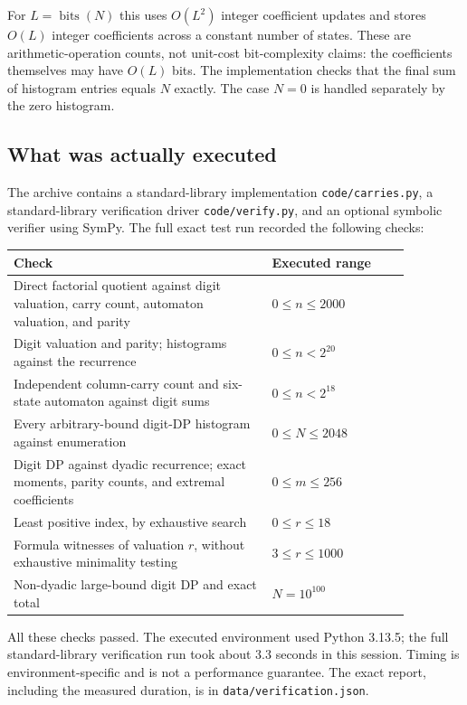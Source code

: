 \documentclass[11pt]{article}
\theoremstyle{definition}\newtheorem{definition}[theorem]{Definition}
\theoremstyle{remark}\newtheorem{remark}[theorem]{Remark}
\newcommand{\bits}{\operatorname{bits}}
\begin{document}
For $L=\bits(N)$ this uses $O(L^2)$ integer coefficient updates and stores
$O(L)$ integer coefficients across a constant number of states. These
are arithmetic-operation counts, not unit-cost bit-complexity claims:
the coefficients themselves may have $O(L)$ bits. The implementation
checks that the final sum of histogram entries equals $N$ exactly.
The case $N=0$ is handled separately by the zero histogram.

\subsection{What was actually executed}
The archive contains a standard-library implementation
\texttt{code/carries.py}, a standard-library verification driver
\texttt{code/verify.py}, and an optional symbolic verifier using SymPy.
The full exact test run recorded the following checks:
\begin{center}
\begin{tabular}{p{0.57\linewidth}p{0.30\linewidth}}
\toprule
Check & Executed range\\
\midrule
Direct factorial quotient against digit valuation, carry count,
automaton valuation, and parity & $0\leq n\leq2000$\\
Digit valuation and parity; histograms against the recurrence
& $0\leq n<2^{20}$\\
Independent column-carry count and six-state automaton against digit sums
& $0\leq n<2^{18}$\\
Every arbitrary-bound digit-DP histogram against enumeration
& $0\leq N\leq2048$\\
Digit DP against dyadic recurrence; exact moments, parity counts,
and extremal coefficients & $0\leq m\leq256$\\
Least positive index, by exhaustive search & $0\leq r\leq18$\\
Formula witnesses of valuation $r$, without exhaustive minimality testing
& $3\leq r\leq1000$\\
Non-dyadic large-bound digit DP and exact total & $N=10^{100}$\\
\bottomrule
\end{tabular}
\end{center}
All these checks passed. The executed environment used Python 3.13.5;
the full standard-library verification run took about 3.3 seconds in
this session. Timing is environment-specific and is not a performance
guarantee. The exact report, including the measured duration, is in
\texttt{data/verification.json}.
\end{document}
